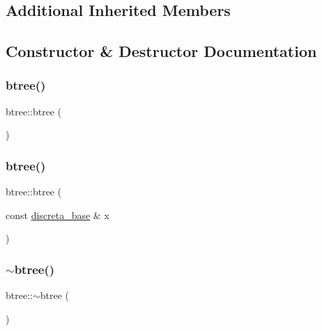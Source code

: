 \subsection*{Additional Inherited Members}


\subsection{Constructor \& Destructor Documentation}
\mbox{\label{classbtree_a91719c0888688e6f11dbeb336f2bd11b}} 
\subsubsection{\texorpdfstring{btree()}{btree()}\hspace{0.1cm}{\footnotesize\ttfamily [1/2]}}
{\footnotesize\ttfamily btree\+::btree (\begin{DoxyParamCaption}{ }\end{DoxyParamCaption})}

\mbox{\label{classbtree_acdd426e62444f342e4fa3ac6a272fb32}} 
\subsubsection{\texorpdfstring{btree()}{btree()}\hspace{0.1cm}{\footnotesize\ttfamily [2/2]}}
{\footnotesize\ttfamily btree\+::btree (\begin{DoxyParamCaption}\item[{const \mbox{\hyperlink{classdiscreta__base}{discreta\+\_\+base}} \&}]{x }\end{DoxyParamCaption})}

\mbox{\label{classbtree_ab3d5728b7a09121f7461fddd08b5f7ef}} 
\subsubsection{\texorpdfstring{$\sim$btree()}{~btree()}}
{\footnotesize\ttfamily btree\+::$\sim$btree (\begin{DoxyParamCaption}{ }\end{DoxyParamCaption})}



